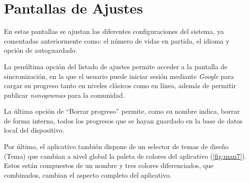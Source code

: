   \section{Pantallas de Ajustes}
  En estas pantallas se ajustan las diferentes configuraciones del sistema,
  ya comentadas anteriormente como: el número de vidas en partida, el idioma y
  opción de autoguardado.

  La penúltima opción del listado de ajustes
  permite acceder a la pantalla de sincronización, en la que el usuario
  puede iniciar sesión mediante \textit{Google} para cargar su progreso tanto
  en niveles clásicos como en línea, además de permitir publicar \textit{nonogramas}
  para la comunidad.

  La última opción de ``Borrar progreso'' permite, como su nombre indica, borrar
  de forma interna, todos los progresos que se hayan guardado en la base de datos
  local del dispositivo.

  Por último, el aplicativo también dispone de un selector de temas de diseño (Tema) que cambian
  a nivel global la paleta de colores del aplicativo (\autoref{fig:man7}). Estos
  están compuestos de un nombre y tres colores diferenciados, que combinados,
  cambian el aspecto completo del aplicativo.
  
